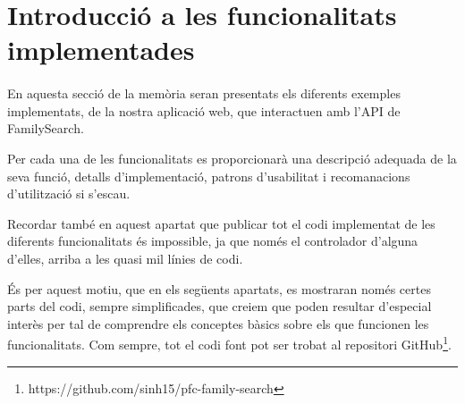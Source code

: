 \section{Introducció a les funcionalitats implementades}

    \paragraph{}
    En aquesta secció de la memòria seran presentats els diferents exemples implementats, de la nostra aplicació web, que interactuen amb l'API de FamilySearch.

    Per cada una de les funcionalitats es proporcionarà una descripció adequada de la seva funció, detalls d'implementació, patrons d'usabilitat i recomanacions d'utilització si s'escau.

    Recordar també en aquest apartat que publicar tot el codi implementat de les diferents funcionalitats és impossible, ja que només el controlador d'alguna d'elles, arriba a les quasi mil línies de codi.

    És per aquest motiu, que en els següents apartats, es mostraran només certes parts del codi, sempre simplificades, que creiem que poden resultar d'especial interès per tal de comprendre els conceptes bàsics sobre els que funcionen les funcionalitats. Com sempre, tot el codi font pot ser trobat al repositori GitHub\footnote{https://github.com/sinh15/pfc-family-search}.

